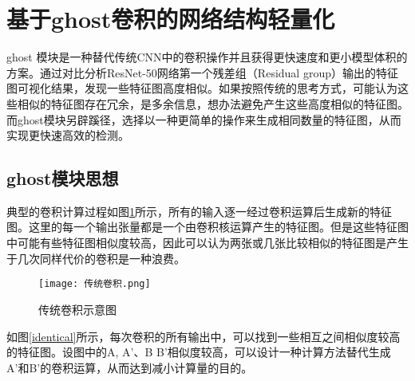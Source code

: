 




\section{基于ghost卷积的网络结构轻量化}
ghost 模块是一种替代传统CNN中的卷积操作并且获得更快速度和更小模型体积的方案。通过对比分析ResNet-50网络第一个残差组（Residual group）输出的特征图可视化结果，发现一些特征图高度相似。如果按照传统的思考方式，可能认为这些相似的特征图存在冗余，是多余信息，想办法避免产生这些高度相似的特征图。而ghost模块另辟蹊径，选择以一种更简单的操作来生成相同数量的特征图，从而实现更快速高效的检测。

\subsection{ghost模块思想}
典型的卷积计算过程如图\ref{conv}所示，所有的输入逐一经过卷积运算后生成新的特征图。这里的每一个输出张量都是一个由卷积核运算产生的特征图。但是这些特征图中可能有些特征图相似度较高，因此可以认为两张或几张比较相似的特征图是产生于几次同样代价的卷积是一种浪费。

\begin{figure}[htbp]
    \centering
    \texttt{[image: 传统卷积.png]}
    \caption{传统卷积示意图}
    \label{conv}
\end{figure}

如图\ref{identical}所示，每次卷积的所有输出中，可以找到一些相互之间相似度较高的特征图。设图中的A, A’、B B’相似度较高，可以设计一种计算方法替代生成A’和B’的卷积运算，从而达到减小计算量的目的。

